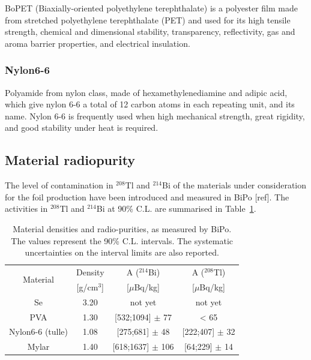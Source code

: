 \documentclass[main.tex]{subfiles}
\begin{document}
\NI BoPET (Biaxially-oriented polyethylene terephthalate) is a polyester film made from stretched polyethylene terephthalate (PET) and used for its high tensile strength, chemical and dimensional stability, transparency, reflectivity, gas and aroma barrier properties, and electrical insulation.


\subsubsection{Nylon6-6}


\NI Polyamide from nylon class, made of hexamethylenediamine and adipic acid, which give nylon 6-6 a total of 12 carbon atoms in each repeating unit, and its name. Nylon 6-6 is frequently used when high mechanical strength, great rigidity, and good stability under heat is required.


\subsection{Material radiopurity}


\NI The level of contamination in $^{\text{208}}$Tl and $^{\text{214}}$Bi of the materials under consideration for the foil production have been introduced and measured in BiPo [ref]. The activities in $^{\text{208}}$Tl and $^{\text{214}}$Bi at 90\% C.L. are summarised in Table~\ref{tab:MeasuredBiPoAndDensity}.


\begin{table}[h!]
\centering
\begin{tabular}{c|c|c|c}
\toprule
\multirow{2}{*}{Material} & Density           &  A ($^{\text{214}}$Bi) & A ($^{\text{208}}$Tl) \\[0.1cm]
                          & [g/cm$^\text{3}$] & [$\mu$Bq/kg]           & [$\mu$Bq/kg] \\[0.1cm]
\hline
 Se                       & 3.20              & not yet                & not yet \\[0.1cm] 
\hline
PVA                       & 1.30              & [532;1094] $\pm$ 77 & < 65 \\ [0.1cm]
\hline
Nylon6-6 (tulle)          & 1.08              & [275;681] $\pm$ 48  & [222;407] $\pm$ 32 \\[0.1cm]
\hline
Mylar                     & 1.40              & [618;1637] $\pm$ 106 & [64;229] $\pm$ 14 \\ [0.1cm]    
\bottomrule                  
\end{tabular}
\caption{Material densities and radio-purities, as measured by BiPo. The values represent the 90\% C.L. intervals. The systematic uncertainties on the interval limits are also reported.}
\label{tab:MeasuredBiPoAndDensity}
\end{table}
\end{document}
